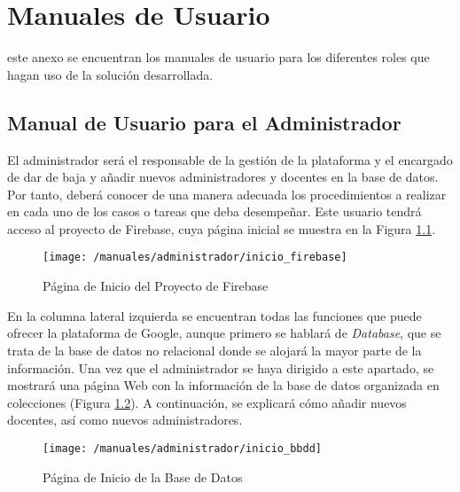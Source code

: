 \chapter{Manuales de Usuario}
\label{chap:manuales}
 este anexo se encuentran los manuales de usuario para los diferentes roles que hagan uso de la solución desarrollada.

\section*{Manual de Usuario para el Administrador}
El administrador será el responsable de la gestión de la plataforma y el encargado de dar de baja y añadir nuevos administradores y docentes en la base de datos. Por tanto, deberá conocer de una manera adecuada los procedimientos a realizar en cada uno de los casos o tareas que deba desempeñar. Este usuario tendrá acceso al proyecto de Firebase, cuya página inicial se muestra en la Figura \ref{fig:iniciofirebase}.

\begin{figure}[!h]
	\begin{center}
		\texttt{[image: /manuales/administrador/inicio\_firebase]}
		\caption{Página de Inicio del Proyecto de Firebase}
		\label{fig:iniciofirebase}
	\end{center}
\end{figure}

\clearpage

En la columna lateral izquierda se encuentran todas las funciones que puede ofrecer la plataforma de Google, aunque primero se hablará de \textit{Database}, que se trata de la base de datos no relacional donde se alojará la mayor parte de la información. Una vez que el administrador se haya dirigido a este apartado, se mostrará una página Web con la información de la base de datos organizada en colecciones (Figura \ref{fig:iniciobbdd}). A continuación, se explicará cómo añadir nuevos docentes, así como nuevos administradores.

\begin{figure}[!h]
	\begin{center}
		\texttt{[image: /manuales/administrador/inicio\_bbdd]}
		\caption{Página de Inicio de la Base de Datos}
		\label{fig:iniciobbdd}
	\end{center}
\end{figure}

\clearpage

